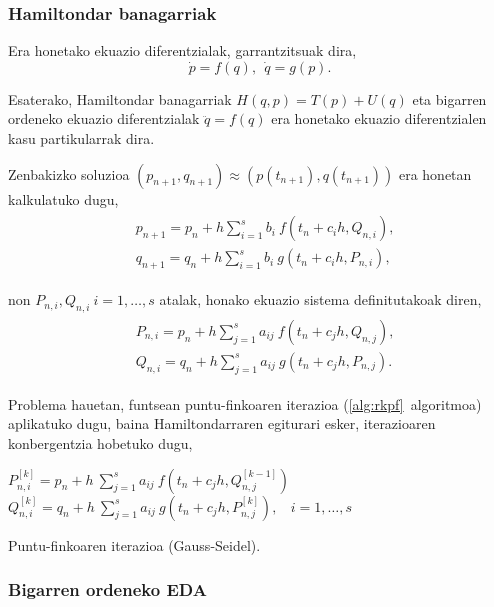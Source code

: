 \subsubsection*{Hamiltondar banagarriak}

Era honetako ekuazio diferentzialak, garrantzitsuak dira,
\begin{equation*}
\dot{p}=f(q), \ \ \dot{q}=g(p).
\end{equation*}

Esaterako, Hamiltondar banagarriak $H(q,p)=T(p)+U(q)$ eta bigarren ordeneko ekuazio diferentzialak $\ddot{q}=f(q)$ era honetako ekuazio diferentzialen kasu partikularrak dira.

Zenbakizko soluzioa $(p_{n+1},q_{n+1}) \approx (p(t_{n+1}),q(t_{n+1}))$ era honetan kalkulatuko dugu,
\begin{align}
\begin{split}
&p_{n+1}=p_n+ h \sum\limits_{i=1}^{s} b_i \ f(t_n+c_ih,Q_{n,i}),\\
&q_{n+1}=q_n+ h \sum\limits_{i=1}^{s} b_i \ g(t_n+c_ih,P_{n,i}),
\end{split}
\end{align}

non $P_{n,i},Q_{n,i} \ i=1,\dots,s$ atalak, honako ekuazio sistema definitutakoak diren, 
\begin{align}
\begin{split}
&P_{n,i} =p_n+ h \sum\limits_{j=1}^{s} a_{ij} \ f(t_n+c_jh,Q_{n,j}), \\
&Q_{n,i} =q_n+ h \sum\limits_{j=1}^{s} a_{ij} \ g(t_n+c_jh,P_{n,j}).
\end{split}
\end{align}

Problema hauetan,  funtsean puntu-finkoaren iterazioa (\ref{alg:rkpf}~algoritmoa) aplikatuko dugu, baina Hamiltondarraren egiturari esker, iterazioaren konbergentzia hobetuko dugu,   

\begin{algorithm}[H]
  {
  \BlankLine
   $P_{n,i}^{[k]}=p_{n}+ h \ \sum\limits_{j=1}^{s} a_{ij} \ f(t_n+c_jh,Q_{n,j}^{[k-1]})$\; 
   $Q_{n,i}^{[k]}=q_{n}+ h \ \sum\limits_{j=1}^{s} a_{ij} \ g(t_n+c_jh,P_{n,j}^{[k]}), \ \ \ \ i=1,\dots,s $\; 
  }
 \caption{Puntu-finkoaren iterazioa (Gauss-Seidel).}
 \label{alg:rkfppart}
\end{algorithm}


\subsubsection*{Bigarren ordeneko EDA}

